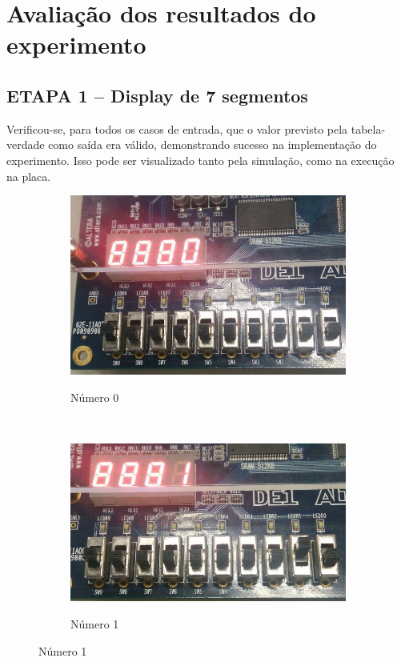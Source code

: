 \chapter{Avaliação dos resultados do experimento}
	\section{ETAPA 1 – Display de 7 segmentos}

		Verificou-se, para todos os casos de entrada, que o valor previsto pela tabela-verdade
como saída era válido, demonstrando sucesso na implementação do experimento. Isso pode ser visualizado
tanto pela simulação, como na execução na placa.

		\begin{figure}[H]
			\centering

			\begin{subfigure}[b]{0.44\textwidth}
				\includegraphics[width=\textwidth]{img/etapa1/0}
				\label{fig:etapa1-0}
				\caption{Número 0}
			\end{subfigure}
			~
			\begin{subfigure}[b]{0.44\textwidth}
				\includegraphics[width=\textwidth]{img/etapa1/1}
				\label{fig:etapa1-1}
				\caption{Número 1}
			\end{subfigure}


\end{figure}
